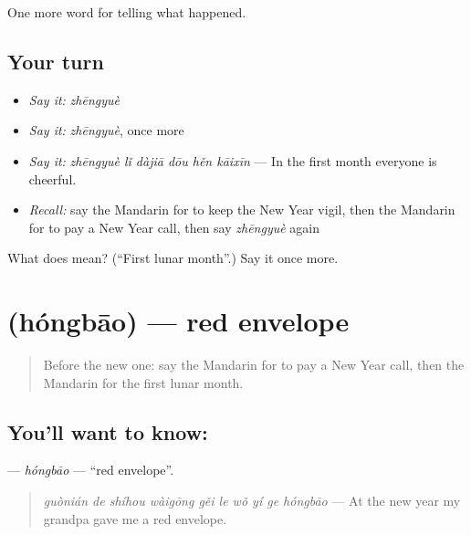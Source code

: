 \begin{grammarlens}[title={What you've built}]
One more word for telling what happened.
\end{grammarlens}

\subsection*{Your turn}
\begin{itemize}
\raggedright
  \item \emph{Say it:} \emph{zhēngyuè}
  \item \emph{Say it:} \emph{zhēngyuè}, once more
  \item \emph{Say it:} \emph{zhēngyuè lǐ dàjiā dōu hěn kāixīn} — In the first month everyone is cheerful.
  \item \emph{Recall:} say the Mandarin for to keep the New Year vigil, then the Mandarin for to pay a New Year call, then say \emph{zhēngyuè} again
\end{itemize}

\begin{tcolorbox}[breakable,colback=teal!4,colframe=teal!35!black,title={Before you move on}]
What does  mean? (\textquotedblleft{}First lunar month\textquotedblright{}.) Say it once more.
\end{tcolorbox}
\section[\texorpdfstring{\zh{红包} (hóngbāo)}{红包 (hóngbāo)}]{ (hóngbāo) — red envelope}

\label{lesson:ZH-C334-hongbao}



\begin{quote}
Before the new one: say the Mandarin for to pay a New Year call, then the Mandarin for the first lunar month.
\end{quote}

\subsection*{You'll want to know: }
\textbf{} — \emph{hóngbāo} — \textquotedblleft{}red envelope\textquotedblright{}.

\begin{quote}
\textbf{} \emph{guònián de shíhou wàigōng gěi le wǒ yí ge hóngbāo} — At the new year my grandpa gave me a red envelope.
\end{quote}

